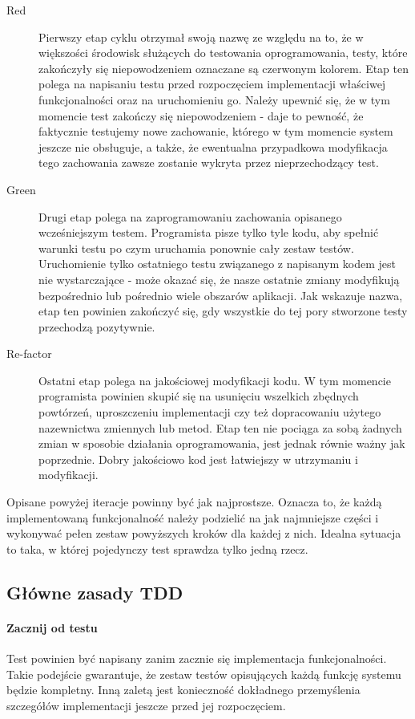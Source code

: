     \begin{description}
      \item[Red] Pierwszy etap cyklu otrzymał swoją nazwę ze względu na to, że w większości środowisk służących do testowania oprogramowania, testy, które zakończyły się niepowodzeniem oznaczane są czerwonym kolorem. Etap ten polega na napisaniu testu przed rozpoczęciem implementacji właściwej funkcjonalności oraz na uruchomieniu go. Należy upewnić się, że w tym momencie test zakończy się niepowodzeniem - daje to pewność, że faktycznie testujemy nowe zachowanie, którego w tym momencie system jeszcze nie obsługuje, a także, że ewentualna przypadkowa modyfikacja tego zachowania zawsze zostanie wykryta przez nieprzechodzący test.
      \item[Green] Drugi etap polega na zaprogramowaniu zachowania opisanego wcześniejszym testem. Programista pisze tylko tyle kodu, aby spełnić warunki testu po czym uruchamia ponownie cały zestaw testów. Uruchomienie tylko ostatniego testu związanego z napisanym kodem jest nie wystarczające - może okazać się, że nasze ostatnie zmiany modyfikują bezpośrednio lub pośrednio wiele obszarów aplikacji. Jak wskazuje nazwa, etap ten powinien zakończyć się, gdy wszystkie do tej pory stworzone testy przechodzą pozytywnie.
      \item[Re-factor] Ostatni etap polega na jakościowej modyfikacji kodu. W tym momencie programista powinien skupić się na usunięciu wszelkich zbędnych powtórzeń, uproszczeniu implementacji czy też dopracowaniu użytego nazewnictwa zmiennych lub metod. Etap ten nie pociąga za sobą żadnych zmian w sposobie działania oprogramowania, jest jednak równie ważny jak poprzednie. Dobry jakościowo kod jest łatwiejszy w utrzymaniu i modyfikacji.
    \end{description}
    
    Opisane powyżej iteracje powinny być jak najprostsze. Oznacza to, że każdą implementowaną funkcjonalność należy podzielić na jak najmniejsze części i wykonywać pełen zestaw powyższych kroków dla każdej z nich. Idealna sytuacja to taka, w której pojedynczy test sprawdza tylko jedną rzecz.

  \subsection{Główne zasady TDD}
    \paragraph{Zacznij od testu}
      Test powinien być napisany zanim zacznie się implementacja funkcjonalności. Takie podejście gwarantuje, że zestaw testów opisujących każdą funkcję systemu będzie kompletny. Inną zaletą jest konieczność dokładnego przemyślenia szczegółów implementacji jeszcze przed jej rozpoczęciem.
